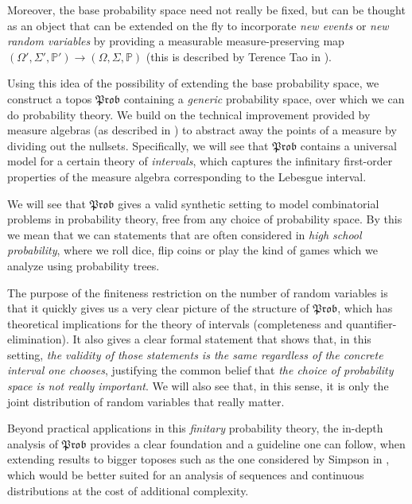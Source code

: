 \documentclass[a4paper]{amsproc}
\theoremstyle{plain}
\theoremstyle{definition}
\theoremstyle{remark}
\numberwithin{equation}{section}
\newcommand{\Prob}{\mathfrak{Prob}}
\begin{document}
Moreover, the base probability space need not really be fixed, but can be thought as an object that can be extended on the fly to incorporate \emph{new events} or \emph{new random variables} by providing a measurable measure-preserving map $(\Omega',\Sigma',\mathbb{P}') \to (\Omega,\Sigma, \mathbb{P})$ (this is described by Terence Tao in \cite{tao2010review}).

Using this idea of the possibility of extending the base probability space, we construct a topos $\Prob$ containing a \emph{generic} probability space, over which we can do probability theory. We build on the technical improvement provided by measure algebras (as described in \cite{fremlin2012measure}) to abstract away the points of a measure by dividing out the nullsets. Specifically, we will see that $\Prob$ contains a universal model for a certain theory of \emph{intervals}, which captures the infinitary first-order properties of the measure algebra corresponding to the Lebesgue interval.

We will see that $\Prob$ gives a valid synthetic setting to model combinatorial problems in probability theory, free from any choice of probability space. By this we mean that we can statements that are often considered in \emph{high school probability}, where we roll dice, flip coins or play the kind of games which we analyze using probability trees.

The purpose of the finiteness restriction on the number of random variables is that it quickly gives us a very clear picture of the structure of $\Prob$, which has theoretical implications for the theory of intervals (completeness and quantifier-elimination). It also gives a clear formal statement that shows that, in this setting, \emph{the validity of those statements is the same regardless of the concrete interval one chooses}, justifying the common belief that \emph{the choice of probability space is not really important}. We will also see that, in this sense, it is only the joint distribution of random variables that really matter.


Beyond practical applications in this \emph{finitary} probability theory, the in-depth analysis of $\Prob$ provides a clear foundation and a guideline one can follow, when extending results to bigger toposes such as the one considered by Simpson in \cite{simpson2017probability}, which would be better suited for an analysis of sequences and continuous distributions at the cost of additional complexity.
\end{document}
